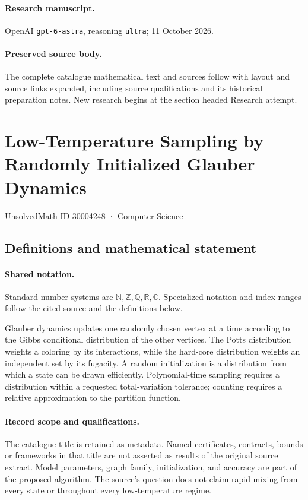 \documentclass[11pt]{article}
\begin{document}
\paragraph{Research manuscript.} OpenAI \texttt{gpt-6-astra}, reasoning \texttt{ultra}; 11 October 2026.
\paragraph{Preserved source body.} The complete catalogue mathematical text and sources follow with layout and source links expanded, including source qualifications and its historical preparation notes. New research begins at the section headed Research attempt.

\section{Low-Temperature Sampling by Randomly Initialized Glauber Dynamics}\label{30004248}
{\small UnsolvedMath ID 30004248 · Computer Science}
\subsection{Definitions and mathematical statement}

\paragraph{Shared notation.}Standard number systems are $\mathbb N,\mathbb Z,\mathbb Q,\mathbb R,\mathbb C$. Specialized notation and index ranges follow the cited source and the definitions below.


Glauber dynamics updates one randomly chosen vertex at a time according to the Gibbs conditional distribution of the other vertices. The Potts distribution weights a coloring by its interactions, while the hard-core distribution weights an independent set by its fugacity. A random initialization is a distribution from which a state can be drawn efficiently. Polynomial-time sampling requires a distribution within a requested total-variation tolerance; counting requires a relative approximation to the partition function.
\paragraph{Record scope and qualifications.}
The catalogue title is retained as metadata. Named certificates, contracts, bounds or frameworks in that title are not asserted as results of the original source extract.
Model parameters, graph family, initialization, and accuracy are part of the proposed algorithm. The source's question does not claim rapid mixing from every state or throughout every low-temperature regime.
\end{document}
